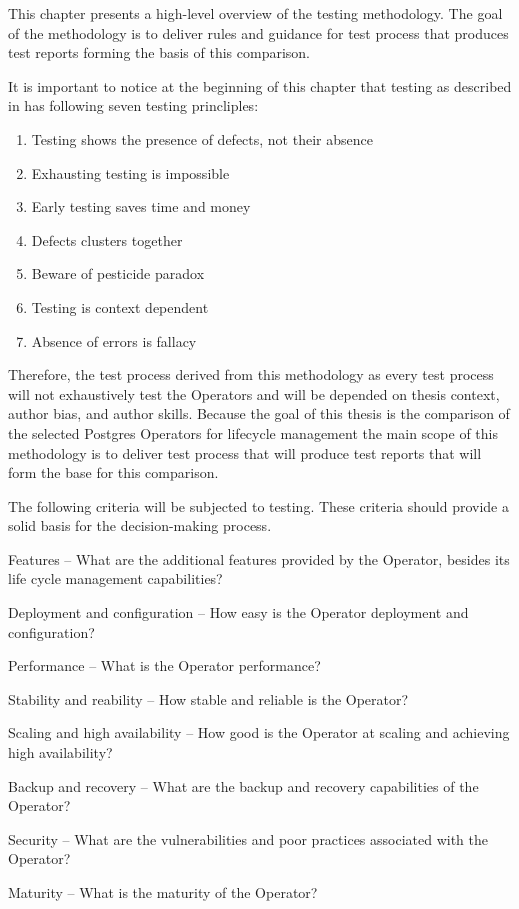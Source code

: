 


This chapter presents a high-level overview of the testing methodology. The goal of the methodology is to deliver rules and guidance for test process that produces test reports forming the basis of this comparison.

It is important to notice at the beginning of this chapter that testing as described in \cite{FoundationOfSoftwareTesting} has following seven testing princliples:
\begin{enumerate}
  \item Testing shows the presence of defects, not their absence
  \item Exhausting testing is impossible
  \item Early testing saves time and money
  \item Defects clusters together
  \item Beware of pesticide paradox
  \item Testing is context dependent
  \item Absence of errors is fallacy
\end{enumerate}



Therefore, the test process derived from this methodology as every test process will not exhaustively test the Operators and will be depended on thesis context, author bias, and author skills. Because the goal of this thesis is the comparison of the selected Postgres Operators for lifecycle management the main scope of this methodology is to deliver test process that will produce test reports that will form the base for this comparison.

The following criteria will be subjected to testing. These criteria should provide a solid basis for the decision-making process.
\begin{criterias}
  \item	Features – What are the additional features provided by the Operator, besides its life cycle management capabilities?
  \item	Deployment and configuration – How easy is the Operator deployment and configuration?
  \item	Performance – What is the Operator performance?
  \item	Stability and reability – How stable and reliable is the Operator?
  \item	Scaling and high availability – How good is the Operator at scaling and achieving high availability?
  \item	Backup and recovery – What are the backup and recovery capabilities of the Operator?
  \item	Security – What are the vulnerabilities and poor practices associated with the Operator?
  \item	Maturity – What is the maturity of the Operator?
\end{criterias}



